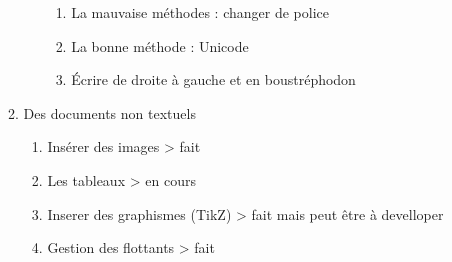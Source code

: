 \begin{enumerate}
\begin{enumerate}
\begin{enumerate}
\begin{enumerate}
			\item La mauvaise méthodes : changer de police
			\item La bonne méthode : Unicode
			\item Écrire de droite à gauche et en boustréphodon
		\end{enumerate}
		\end{enumerate}
	\item Des documents non textuels
		\begin{enumerate}
		\item Insérer des images						> fait
		\item Les tableaux							> en cours	
		\item Inserer des graphismes (TikZ)				> fait mais peut être à develloper
		\item Gestion des flottants					> fait
		\end{enumerate}
\end{enumerate}


\end{enumerate}
